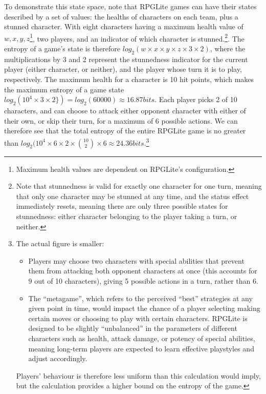 To demonstrate this state space, note that RPGLite games can have their states
described by a set of values: the healths of characters on each team, plus a
stunned character. With eight characters having a maximum health value of $w, x,
y, z$\footnote{Maximum health values are dependent on RPGLite's configuration.},
two players, and an indicator of which character is stunned.\footnote{Note that
stunnedness is valid for exactly one character for one turn, meaning that only
one character may be stunned at any time, and the status effect immediately
resets, meaning there are only three possible states for stunnedness: either
character belonging to the player taking a turn, or neither.}. The entropy of a
game's state is therefore
\(log_2(w\times{}x\times{}y\times{}z\times{}3\times{}2)\), where the
multiplications by 3 and 2 represent the stunnedness indicator for the current
player (either character, or neither), and the player whose turn it is to play,
respectively. The maximum health for a character is 10 hit points, which makes
the maximum entropy of a game state \(log_2(10^{4}\times{}3\times{}2\}) =
log_2(60000) \approx 16.87 bits\). Each player picks 2 of 10 characters, and can
choose to attack either opponent character with either of their own, or skip
their turn, for a maximum of 6 possible actions. We can therefore see that the
total entropy of the entire RPGLite game is no greater than
\(log_2(10^{4}\times{}6\times{}2\times{}{10\choose2}\times{}6 \approx 24.36
bits\).\footnote{The actual figure is smaller: \begin{itemize}\item Players may
choose two characters with special abilities that prevent them from attacking
both opponent characters at once (this accounts for 9 out of 10 characters),
giving 5 possible actions in a turn, rather than 6.\item The ``metagame'', which
refers to the perceived ``best'' strategies at any given point in time, would
impact the chance of a player selecting making certain moves or choosing to play
with certain characters. RPGLite is designed to be slightly ``unbalanced'' in
the parameters of different characters such as health, attack damage, or potency
of special abilities, meaning long-term players are expected to learn effective
playstyles and adjust accordingly.\end{itemize}\par{}\indent{}Players' behaviour
is therefore less uniform than this calculation would imply, but the calculation
provides a higher bound on the entropy of the game.}

